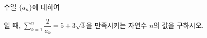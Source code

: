 수열 $\{a_n\}$에 대하여\par\smallskip{}\par\smallskip\noindent 일 때, $\displaystyle\sum_{k=1}^{n}\dfrac{2}{a_k}=5+3\sqrt{3}$을 만족시키는 자연수 $n$의 값을 구하시오.

